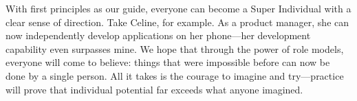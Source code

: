 {%

With first principles as our guide, everyone can become a Super Individual with a clear sense of direction. Take Celine, for example. As a product manager, she can now independently develop applications on her phone---her development capability even surpasses mine. We hope that through the power of role models, everyone will come to believe: things that were impossible before can now be done by a single person. All it takes is the courage to imagine and try---practice will prove that individual potential far exceeds what anyone imagined.



}


